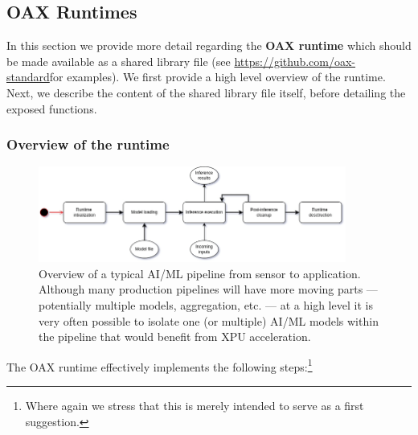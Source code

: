 \documentclass{article}
\newcommand{\oaxgit}{\href{https://github.com/oax-standard}{https://github.com/oax-standard}}
\begin{document}
\subsection{OAX Runtimes}

In this section we provide more detail regarding the \textbf{OAX runtime} which should be made available as a shared library file (see \oaxgit for examples). We first provide a high level overview of the runtime. Next, we describe the content of the shared library file itself, before detailing the exposed functions.

\subsubsection{Overview of the runtime}

\begin{figure} [!htbp]
\centering
\includegraphics[width=0.9\textwidth]{img/runtime}
\caption{Overview of a typical AI/ML pipeline from sensor to application. Although many production pipelines will have more moving parts --- potentially multiple models, aggregation, etc. --- at a high level it is very often possible to isolate one (or multiple) AI/ML models within the pipeline that would benefit from XPU acceleration.}
\label{fig-pipeline}
\end{figure}

The OAX runtime effectively implements the following steps:\footnote{Where again we stress that this is merely intended to serve as a first suggestion.}
\end{document}
